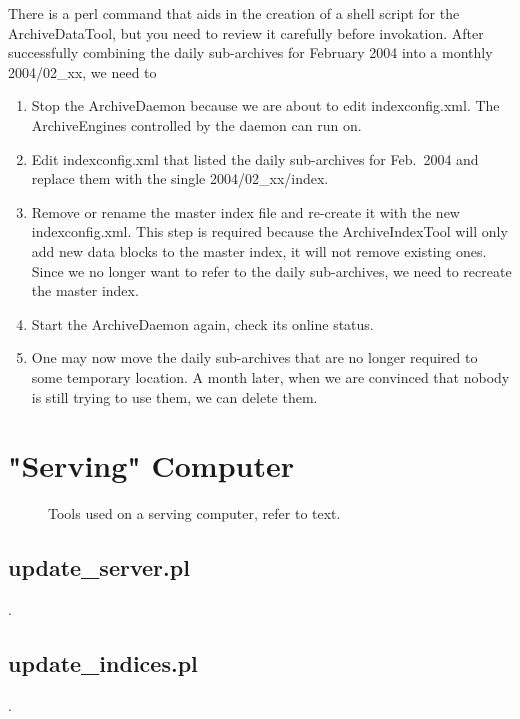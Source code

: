 There is a perl command  that aids in the
creation of a shell script for the ArchiveDataTool, but you need to
review it carefully before invokation.
After successfully combining the daily sub-archives for February 2004
into a monthly 2004/02\_xx, we need to
\begin{enumerate}
\item Stop the ArchiveDaemon because we are about to edit
      indexconfig.xml.
      The ArchiveEngines controlled by the daemon can run on.
\item Edit indexconfig.xml that listed the daily sub-archives for
      Feb.\ 2004 and replace them with the single 2004/02\_xx/index.
\item Remove or rename the master index file and re-create it with the new
      indexconfig.xml. This step is required because the ArchiveIndexTool
      will only add new data blocks to the master index, it will not
      remove existing ones. Since we no longer want to refer to the
      daily sub-archives, we need to recreate the master index.
\item Start the ArchiveDaemon again, check its online status.
\item One may now move the daily sub-archives that are no longer
      required to some temporary location. A month later, when we are
      convinced that nobody is still trying to use them, we can delete
      them.
\end{enumerate}

\section{"Serving" Computer}
\begin{figure}[htb]
\begin{center}
\end{center}
\caption{\label{fig:acServe}Tools used on a serving computer, refer to text.}
\end{figure}


\subsection{update\_server.pl} \label{sec:updateServer}.

\subsection{update\_indices.pl} \label{sec:updateIndices}.
